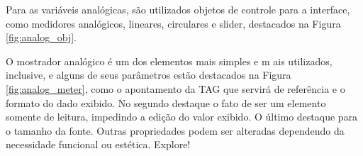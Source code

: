 Para as variáveis analógicas, 
são utilizados objetos de controle para a interface, 
como medidores analógicos, lineares, circulares e slider, 
destacados na Figura \ref{fig:analog_obj}.




\begin{figure}[ht!]
	\centering
\end{figure}




O mostrador analógico é um dos elementos mais simples e m
ais utilizados, inclusive, 
e alguns de seus parâmetros estão destacados na 
Figura \ref{fig:analog_meter}, 
como o apontamento da TAG que servirá de referência e
o formato do dado exibido. 
No segundo destaque o fato de ser um elemento somente de leitura,
impedindo a edição do valor exibido. 
O último destaque para o tamanho da fonte. 
Outras propriedades podem ser alteradas dependendo da necessidade funcional ou estética. 
Explore!


\begin{figure}[ht!]
	\centering
\end{figure}





